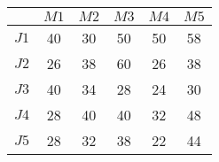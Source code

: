 	\begin{table}[h]
		\centering
	\begin{tabular}{|c|c|c|c|c|c|}
	\hline
	&$M1$&$M2$&$M3$&$M4$&$M5$\\
	\hline
	$J1$&40&30&50&50&58\\
	\hline
	$J2$&26&38&60&26&38\\
	\hline
	$J3$&40&34&28&24&30\\
	\hline
	$J4$&28&40&40&32&48\\
	\hline
	$J5$&28&32&38&22&44\\
	\hline
	\end{tabular}
	\end{table}
